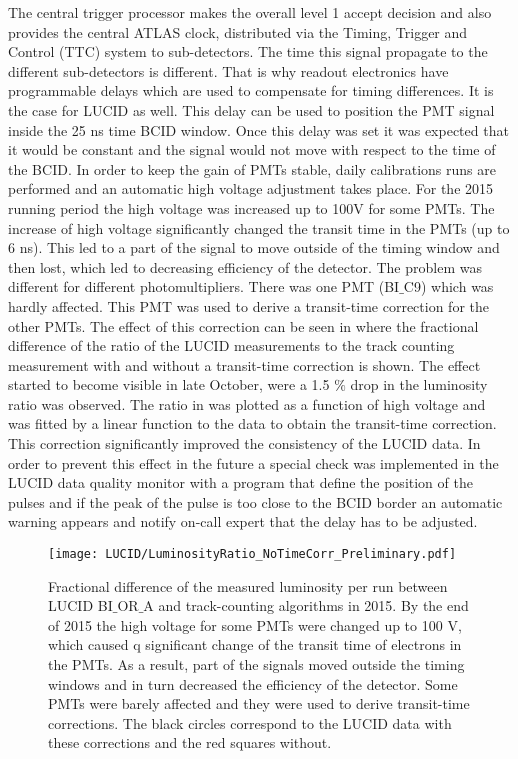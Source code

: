 The central trigger processor makes the overall level 1 accept decision and also provides the central ATLAS clock, distributed via the Timing, Trigger and Control (TTC) system to sub-detectors. 
The time this signal propagate to the different sub-detectors is different. 
That is why readout electronics have programmable delays which are used to compensate for timing differences. It is the case for LUCID as well. 
This delay can be used to position the PMT signal inside the 25 ns time BCID window. 
Once this delay was set it was expected that it would be constant and the signal would not move with respect to the time of the BCID. 
In order to keep the gain of PMTs stable, daily calibrations runs are performed and an automatic high voltage adjustment takes place. 
For the 2015 running period the high voltage was increased up to 100V for some PMTs.
The increase of high voltage significantly changed the transit time in the PMTs (up to 6 ns). 
This led to a part of the signal to move outside of the timing window and then lost, which led to decreasing efficiency of the detector.
The problem was different for different photomultipliers. There was one PMT (BI$\_$C9) which was hardly affected. 
This PMT was used to derive a transit-time correction for the other PMTs.
The effect of this correction can be seen in  where the fractional difference of the ratio of the LUCID measurements to the track counting measurement with and without a transit-time correction is shown.
The effect started to become visible in late October, were a 1.5 $\%$ drop in the luminosity ratio was observed.
The ratio in  was plotted as a function of high voltage and was fitted by a linear function to the data to obtain the transit-time correction.
This correction significantly improved the consistency of the LUCID data. 
In order to prevent this effect in the future a special check was implemented in the LUCID data quality monitor
with a program that define the position of the pulses 
and if the peak of the pulse is too close to the BCID border an automatic warning appears and notify on-call expert that the delay has to be adjusted.

\begin{figure}
\centering
\texttt{[image: LUCID/LuminosityRatio\_NoTimeCorr\_Preliminary.pdf]}
\caption{ 
Fractional difference of the measured luminosity per run between LUCID BI$\_$OR$\_$A and track-counting algorithms in 2015.
By the end of 2015 the high voltage for some PMTs were changed up to 100 V, which caused q significant change of the transit time of electrons in the PMTs.
As a result, part of the signals moved outside the timing windows and in turn decreased the efficiency of the detector.
Some PMTs were barely affected and they were used to derive transit-time corrections.
The black circles correspond to the LUCID data with these corrections and the red squares without.
}
\label{fig:transitTime}
\end{figure}

